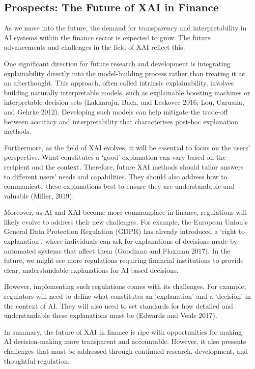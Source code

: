 \documentclass[
  letterpaper,
  DIV=11,
  numbers=noendperiod]{scrartcl}
\begin{document}
\hypertarget{prospects-the-future-of-xai-in-finance}{%
\subsection{Prospects: The Future of XAI in
Finance}\label{prospects-the-future-of-xai-in-finance}}

As we move into the future, the demand for transparency and
interpretability in AI systems within the finance sector is expected to
grow. The future advancements and challenges in the field of XAI reflect
this.

One significant direction for future research and development is
integrating explainability directly into the model-building process
rather than treating it as an afterthought. This approach, often called
intrinsic explainability, involves building naturally interpretable
models, such as explainable boosting machines or interpretable decision
sets (Lakkaraju, Bach, and Leskovec 2016; Lou, Caruana, and Gehrke
2012). Developing such models can help mitigate the trade-off between
accuracy and interpretability that characterises post-hoc explanation
methods.

Furthermore, as the field of XAI evolves, it will be essential to focus
on the users' perspective. What constitutes a `good' explanation can
vary based on the recipient and the context. Therefore, future XAI
methods should tailor answers to different users' needs and
capabilities. They should also address how to communicate these
explanations best to ensure they are understandable and valuable
(Miller, 2019).

Moreover, as AI and XAI become more commonplace in finance, regulations
will likely evolve to address their new challenges. For example, the
European Union's General Data Protection Regulation (GDPR) has already
introduced a `right to explanation', where individuals can ask for
explanations of decisions made by automated systems that affect them
(Goodman and Flaxman 2017). In the future, we might see more regulations
requiring financial institutions to provide clear, understandable
explanations for AI-based decisions.

However, implementing such regulations comes with its challenges. For
example, regulators will need to define what constitutes an
`explanation' and a `decision' in the context of AI. They will also need
to set standards for how detailed and understandable these explanations
must be (Edwards and Veale 2017).

In summary, the future of XAI in finance is ripe with opportunities for
making AI decision-making more transparent and accountable. However, it
also presents challenges that must be addressed through continued
research, development, and thoughtful regulation.
\end{document}
